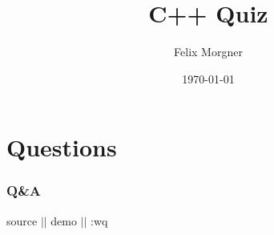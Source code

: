\documentclass{beamer}
\title{{\Huge C++ Quiz}}
\author{Felix Morgner}
\institute{Computer Science\\Hochschule für Technik Rapperswil}
\date{\today}
\begin{document}
  \frame{\titlepage}

  
  

  \section{Questions}
  

  \frame
  {
    \frametitle{Q\&A}

    \begin{center}
      \huge source $||$ demo $||$ :wq
    \end{center}

  }

  
\end{document}
